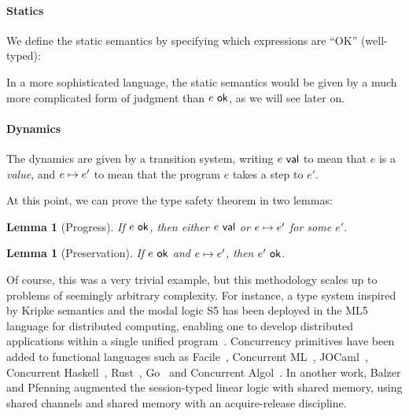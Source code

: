 \documentclass{article}
\newtheorem{lemma}[theorem]{Lemma}
\begin{document}
\paragraph{Statics} We define the static semantics by specifying which
expressions are ``OK'' (well-typed):

In a more sophisticated language, the static semantics would be given
by a much more complicated form of judgment than ${e}\ \mathsf{ok}$, as we
will see later on.

\paragraph{Dynamics}
The dynamics are given by a transition system, writing ${e}\ \mathsf{val}$ to
mean that $e$ is a \emph{value}, and ${e}\mapsto{e'}$ to mean that the
program $e$ takes a step to $e'$.

At this point, we can prove the type safety theorem in two lemmas:
\begin{lemma}[Progress]
  If ${e}\ \mathsf{ok}$, then either ${e}\ \mathsf{val}$ or ${e}\mapsto{e'}$ for some
  $e'$.
\end{lemma}
\begin{lemma}[Preservation]
  If ${e}\ \mathsf{ok}$ and ${e}\mapsto{e'}$, then ${e'}\ \mathsf{ok}$.
\end{lemma}

Of course, this was a very trivial example, but this methodology
scales up to problems of seemingly arbitrary complexity. For instance,
a type system inspired by Kripke semantics and the modal logic S5 has
been deployed in the ML5 language for distributed computing, enabling
one to develop distributed applications within a single unified
program~\cite{murphy-crary-harper:2008}. Concurrency primitives have
been added to functional languages such as
Facile~\cite{giacolone:1989}, Concurrent
ML~\cite{reppy:1991,reppy:2007}, JOCaml~\cite{conchon-fessant:1999},
Concurrent Haskell~\cite{jones-gordon-finne:1996},
Rust~\cite{turon:2012}, Go~\cite{donovan:2015} and Concurrent
Algol~\cite{harper:2016}. In another work, Balzer and Pfenning
augmented the session-typed linear logic with shared memory, using
shared channels and shared memory with an acquire-release discipline.
\end{document}
